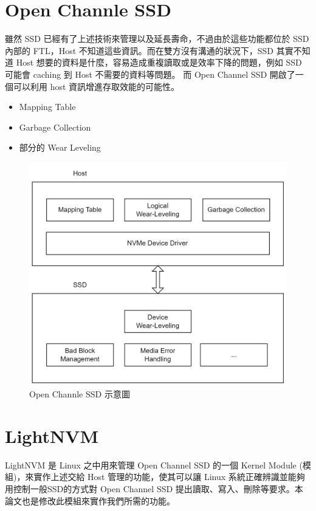 \section{Open Channle SSD}\label{s2.3}
\indent
雖然 SSD 已經有了上述技術來管理以及延長壽命，不過由於這些功能都位於 SSD 內部的 FTL，Host 不知道這些資訊。而在雙方沒有溝通的狀況下，SSD 其實不知道 Host 想要的資料是什麼，容易造成重複讀取或是效率下降的問題，例如 SSD 可能會 caching 到 Host 不需要的資料等問題。
而 Open Channel SSD 開啟了一個可以利用 host 資訊增進存取效能的可能性。
\begin{itemize}
    \item Mapping Table
    \item Garbage Collection
    \item 部分的 Wear Leveling
\end{itemize}
\begin{figure}[H]
    \centering
    \includegraphics[width=1\textwidth]{picture/ch2/OPSSD.png}
    \caption{Open Channle SSD 示意圖\cite{OPSSD}}
    \label{f2.8}
\end{figure}

\section{LightNVM}\label{s2.4}
\indent
LightNVM 是 Linux 之中用來管理 Open Channel SSD 的一個 Kernel Module (模組)，來實作上述交給 Host 管理的功能，使其可以讓 Linux 系統正確辨識並能夠用控制一般SSD的方式對 Open Channel SSD 提出讀取、寫入、刪除等要求。本論文也是修改此模組來實作我們所需的功能。

